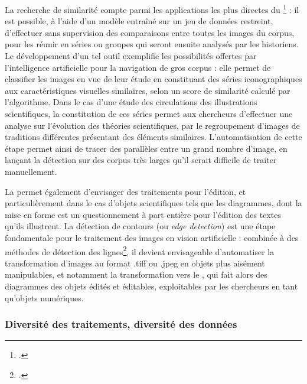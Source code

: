La recherche de similarité compte parmi les applications les plus directes du \dl\footcite{moiraghiExplorerCorpusImages2018} : il est possible, à l'aide d'un modèle entraîné sur un jeu de données restreint, d'effectuer sans supervision des comparaisons entre toutes les images du corpus, pour les réunir en séries ou groupes qui seront ensuite analysés par les historiens. Le développement d'un tel outil exemplifie les possibilités offertes par l'intelligence artificielle pour la navigation de gros corpus : elle permet de classifier les images en vue de leur étude en constituant des séries iconographiques aux caractéristiques visuelles similaires, selon un score de similarité calculé par l'algorithme. Dans le cas d'une étude des circulations des illustrations scientifiques, la constitution de ces séries permet aux chercheurs d'effectuer une analyse sur l'évolution des théories scientifiques, par le regroupement d'images de traditions différentes présentant des éléments similaires. L'automatisation de cette étape permet ainsi de tracer des parallèles entre un grand nombre d'image, en lançant la détection sur des corpus très larges qu'il serait difficile de traiter manuellement.

La \cv permet également d'envisager des traitements pour l'édition, et particulièrement dans le cas d'objets scientifiques tels que les diagrammes, dont la mise en forme est un questionnement à part entière pour l'édition des textes qu'ils illustrent. La détection de contours (ou \textit{edge detection}) est une étape fondamentale pour le traitement des images en vision artificielle : combinée à des méthodes de détection des lignes\footcite{linComprehensiveReviewImage2023}, il devient envisageable d'automatiser la transformation d'images au format .tiff ou .jpeg en objets plus aisément manipulables, et notamment la transformation vers le \svg, qui fait alors des diagrammes des objets édités et éditables, exploitables par les chercheurs en tant qu'objets numériques.

        \subsubsection{Diversité des traitements, diversité des données}

